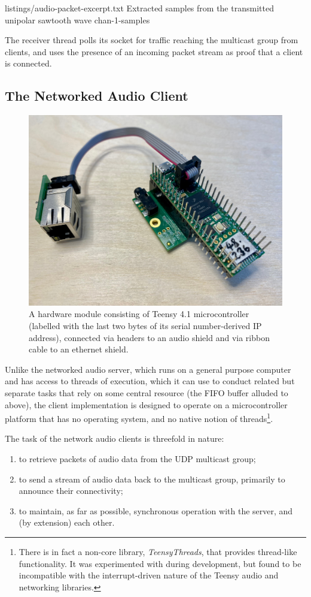 {listings/audio-packet-excerpt.txt}
{Extracted samples from the transmitted unipolar sawtooth wave}
{chan-1-samples}

The receiver thread polls its socket for traffic reaching the multicast group
from clients, and uses the presence of an incoming packet stream as proof that
a client is connected.

\subsection{The Networked Audio Client}\label{subsec:networked-audio-client}

\begin{figure}[ht]
    \centering
    \includegraphics[width=.75\textwidth]{figures/module}
    \caption{A hardware module consisting of Teensy 4.1 microcontroller
        (labelled with the last two bytes of its serial number-derived IP address),
        connected via headers to an audio shield and via ribbon cable to an
        ethernet shield.}
    \label{fig:teensy}
\end{figure}
\noindent
Unlike the networked audio server, which runs on a general purpose computer and
has access to threads of execution, which it can use to conduct related but
separate tasks that rely on some central resource (the FIFO buffer alluded to
above), the client implementation is designed to operate on a microcontroller
platform that has no operating system, and no native notion of threads\footnote{
    There is in fact a non-core library, \textit{TeensyThreads}, that provides
    thread-like functionality. It was experimented with during development,
    but found to be incompatible with the interrupt-driven nature of the
    Teensy audio and networking libraries.
}.

The task of the network audio clients is threefold in nature:
\begin{enumerate}
    \item to retrieve packets of audio data from the UDP multicast group;
    \item to send a stream of audio data back to the multicast group, primarily
    to announce their connectivity;
    \item to maintain, as far as possible, synchronous operation with the
    server, and (by extension) each other.
\end{enumerate}

